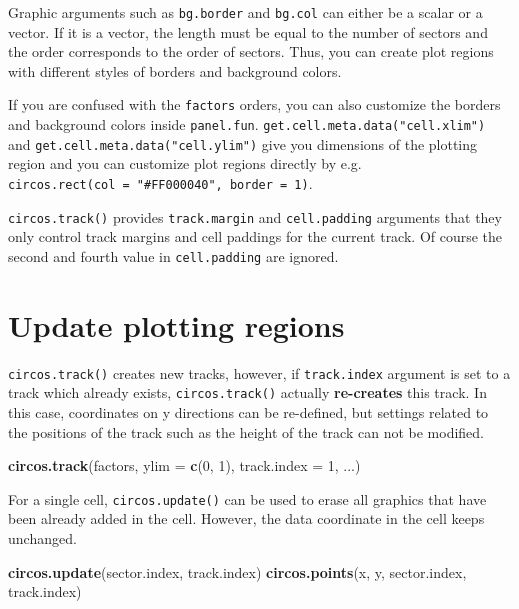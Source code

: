 \documentclass[]{book}
\newenvironment{Shaded}{\begin{snugshade}}{\end{snugshade}}
\newcommand{\KeywordTok}[1]{\textcolor[rgb]{0.13,0.29,0.53}{\textbf{#1}}}
\newcommand{\DataTypeTok}[1]{\textcolor[rgb]{0.13,0.29,0.53}{#1}}
\newcommand{\DecValTok}[1]{\textcolor[rgb]{0.00,0.00,0.81}{#1}}
\newcommand{\NormalTok}[1]{#1}
\theoremstyle{definition}
\theoremstyle{definition}
\theoremstyle{remark}
\begin{document}
Graphic arguments such as \texttt{bg.border} and \texttt{bg.col} can
either be a scalar or a vector. If it is a vector, the length must be
equal to the number of sectors and the order corresponds to the order of
sectors. Thus, you can create plot regions with different styles of
borders and background colors.

If you are confused with the \texttt{factors} orders, you can also
customize the borders and background colors inside \texttt{panel.fun}.
\texttt{get.cell.meta.data("cell.xlim")} and
\texttt{get.cell.meta.data("cell.ylim")} give you dimensions of the
plotting region and you can customize plot regions directly by e.g.
\texttt{circos.rect(col\ =\ "\#FF000040",\ border\ =\ 1)}.

\texttt{circos.track()} provides \texttt{track.margin} and
\texttt{cell.padding} arguments that they only control track margins and
cell paddings for the current track. Of course the second and fourth
value in \texttt{cell.padding} are ignored.

\section{Update plotting regions}\label{update-plotting-regions}

\texttt{circos.track()} creates new tracks, however, if
\texttt{track.index} argument is set to a track which already exists,
\texttt{circos.track()} actually \textbf{re-creates} this track. In this
case, coordinates on y directions can be re-defined, but settings
related to the positions of the track such as the height of the track
can not be modified.

\begin{Shaded}
\begin{Highlighting}[]
\KeywordTok{circos.track}\NormalTok{(factors, }\DataTypeTok{ylim =} \KeywordTok{c}\NormalTok{(}\DecValTok{0}\NormalTok{, }\DecValTok{1}\NormalTok{), }\DataTypeTok{track.index =} \DecValTok{1}\NormalTok{, ...)}
\end{Highlighting}
\end{Shaded}

For a single cell, \texttt{circos.update()} can be used to erase all
graphics that have been already added in the cell. However, the data
coordinate in the cell keeps unchanged.

\begin{Shaded}
\begin{Highlighting}[]
\KeywordTok{circos.update}\NormalTok{(sector.index, track.index)}
\KeywordTok{circos.points}\NormalTok{(x, y, sector.index, track.index)}
\end{Highlighting}
\end{Shaded}
\end{document}
